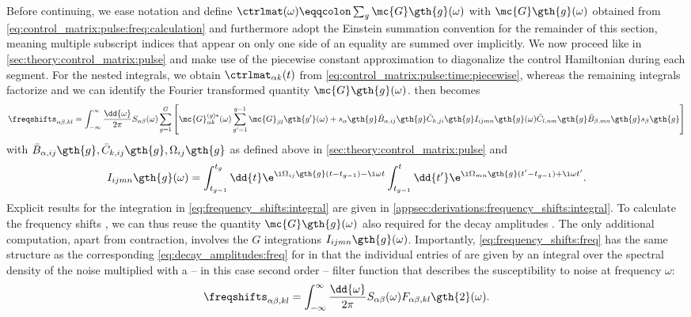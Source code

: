 Before continuing, we ease notation and define $\ctrlmat(\omega) \eqqcolon \sum_g\mc{G}\gth{g}(\omega)$ with $\mc{G}\gth{g}(\omega)$ obtained from \cref{eq:control_matrix:pulse:freq:calculation} and furthermore adopt the Einstein summation convention for the remainder of this section, meaning multiple subscript indices that appear on only one side of an equality are summed over implicitly. We now proceed like in \cref{sec:theory:control_matrix:pulse} and make use of the piecewise constant approximation to diagonalize the control Hamiltonian during each segment. For the nested integrals, we obtain $\ctrlmat_{\alpha k}(t)$ from \cref{eq:control_matrix:pulse:time:piecewise}, whereas the remaining integrals factorize and we can identify the Fourier transformed quantity $\mc{G}\gth{g}(\omega)$.  then becomes
\begin{equation}\label{eq:frequency_shifts:freq}
    \freqshifts_{\alpha\beta,kl} = \int_{-\infty}^\infty\frac{\dd{\omega}}{2\pi} S_{\alpha\beta}(\omega)\sum_{g=1}^G\left[
        \mc{G}_{\alpha k}^{(g)\ast}(\omega)\sum_{g'=1}^{g-1}\mc{G}_{\beta l}\gth{g'}(\omega) +
        s_\alpha\gth{g}\bar{B}_{\alpha,ij}\gth{g}\bar{C}_{k,ji}\gth{g} I_{ijmn}\gth{g}(\omega)
        \bar{C}_{l,nm}\gth{g}\bar{B}_{\beta,mn}\gth{g} s_\beta\gth{g}
    \right]
\end{equation}
with $\bar{B}_{\alpha,ij}\gth{g},\bar{C}_{k,ij}\gth{g},\Omega_{ij}\gth{g}$ as defined above in \cref{sec:theory:control_matrix:pulse} and
\begin{equation}\label{eq:frequency_shifts:integral}
    I_{ijmn}\gth{g}(\omega) = \int_{t_{g-1}}^{t_g}\dd{t}\e^{\i\Omega_{ij}\gth{g}(t - t_{g-1}) - \i\omega t}
                              \int_{t_{g-1}}^{t}\dd{t'}\e^{\i\Omega_{mn}\gth{g}(t' - t_{g-1}) + \i\omega t'}.
\end{equation}
Explicit results for the integration in \cref{eq:frequency_shifts:integral} are given in \cref{appsec:derivations:frequency_shifts:integral}. To calculate the frequency shifts \freqshifts, we can thus reuse the quantity $\mc{G}\gth{g}(\omega)$ also required for the decay amplitudes \decayamps. The only additional computation, apart from contraction, involves the $G$ integrations $I_{ijmn}\gth{g}(\omega)$. Importantly, \cref{eq:frequency_shifts:freq} has the same structure as the corresponding \cref{eq:decay_amplitudes:freq} for \decayamps in that the individual entries of \freqshifts are given by an integral over the spectral density of the noise multiplied with a -- in this case second order -- filter function that describes the susceptibility to noise at frequency $\omega$:
\begin{equation}\label{eq:frequency_shifts:filter_function}
    \freqshifts_{\alpha\beta,kl} = \int_{-\infty}^\infty\frac{\dd{\omega}}{2\pi} S_{\alpha\beta}(\omega) F_{\alpha\beta,kl}\gth{2}(\omega).
\end{equation}

